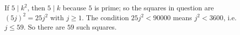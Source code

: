 If $5\mid k^2$, then $5\mid k$ because $5$ is prime; so the squares in question are $(5j)^2=25j^2$ with $j\ge1$. The condition $25j^2<90000$ means $j^2<3600$, i.e.\ $j\le59$. So there are $\boxed{59}$ such squares.
